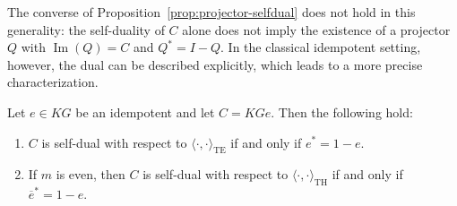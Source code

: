 \documentclass[11pt]{article}
\begin{document}
The converse of Proposition~\ref{prop:projector-selfdual} does not hold in this generality: the self-duality of $C$ alone does not imply the existence of a projector $Q$ with $\operatorname{Im}(Q)=C$ and $Q^\ast=I-Q$. In the classical idempotent setting, however, the dual can be described explicitly, which leads to a more precise characterization.




\begin{corollary}\label{self-idempo} Let $e\in KG$ be an idempotent and let $C=KGe$. Then the following hold:
\begin{enumerate}
    \item $C$ is self-dual with respect to $\langle\cdot,\cdot\rangle_{\mathrm{TE}}$ if and only if $e^\ast=1-e$.
    \item If $m$ is even, then $C$ is self-dual with respect to $\langle\cdot,\cdot\rangle_{\mathrm{TH}}$ if and only if $\overline{e}^\ast=1-e$.
    \end{enumerate}
\end{corollary}
\end{document}
